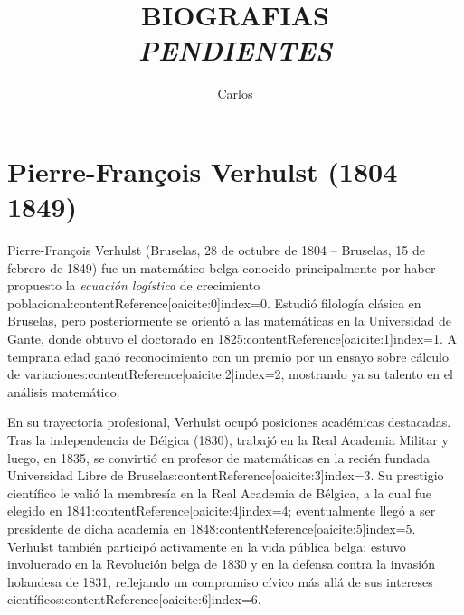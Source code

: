 \documentclass[12pt]{article}
\title{BIOGRAFIAS \\
\textit{PENDIENTES}}
\author{Carlos}
\date{}
\begin{document}
\maketitle
\tableofcontents


\section{Pierre-François Verhulst (1804--1849)}

Pierre-François Verhulst (Bruselas, 28 de octubre de 1804 – Bruselas, 15 de febrero de 1849) fue un matemático belga conocido principalmente por haber propuesto la \emph{ecuación logística} de crecimiento poblacional:contentReference[oaicite:0]{index=0}. Estudió filología clásica en Bruselas, pero posteriormente se orientó a las matemáticas en la Universidad de Gante, donde obtuvo el doctorado en 1825:contentReference[oaicite:1]{index=1}. A temprana edad ganó reconocimiento con un premio por un ensayo sobre cálculo de variaciones:contentReference[oaicite:2]{index=2}, mostrando ya su talento en el análisis matemático.

En su trayectoria profesional, Verhulst ocupó posiciones académicas destacadas. Tras la independencia de Bélgica (1830), trabajó en la Real Academia Militar y luego, en 1835, se convirtió en profesor de matemáticas en la recién fundada Universidad Libre de Bruselas:contentReference[oaicite:3]{index=3}. Su prestigio científico le valió la membresía en la Real Academia de Bélgica, a la cual fue elegido en 1841:contentReference[oaicite:4]{index=4}; eventualmente llegó a ser presidente de dicha academia en 1848:contentReference[oaicite:5]{index=5}. Verhulst también participó activamente en la vida pública belga: estuvo involucrado en la Revolución belga de 1830 y en la defensa contra la invasión holandesa de 1831, reflejando un compromiso cívico más allá de sus intereses científicos:contentReference[oaicite:6]{index=6}.
\end{document}
